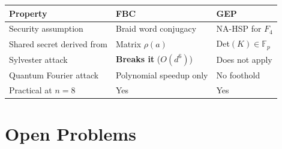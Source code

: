 \documentclass[11pt,letterpaper]{article}
\theoremstyle{definition}
\begin{document}
\begin{center}
\begin{tabular}{lll}
\toprule
Property & FBC & GEP \\
\midrule
Security assumption & Braid word conjugacy & NA-HSP for $F_4$ \\
Shared secret derived from & Matrix $\rho(a)$ & Det$(K) \in \mathbb{F}_p$ \\
Sylvester attack & \textbf{Breaks it} ($O(d^6)$) & Does not apply \\
Quantum Fourier attack & Polynomial speedup only & No foothold \\
Practical at $n=8$ & Yes & Yes \\
\bottomrule
\end{tabular}
\end{center}

\section{Open Problems}
\label{sec:open}
\end{document}
